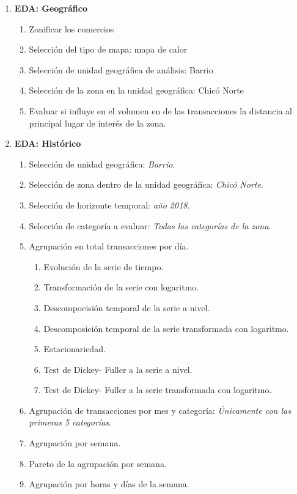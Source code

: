 \documentclass[a4paper]{article}
\begin{document}
\begin{enumerate}
	\item \textbf{EDA: Geográfico}
	\begin{enumerate}
		\item Zonificar los comercios
		\item Selección del tipo de mapa: mapa de calor
		\item Selección de unidad geográfica de análisis: Barrio
		\item Selección de la zona en la unidad geográfica: Chicó Norte
		\item Evaluar si influye en el volumen en de las transacciones la distancia al principal lugar de interés de la zona.
	\end{enumerate}
	\item \textbf{EDA: Histórico}
	\begin{enumerate}
		\item Selección de unidad geográfica: \textit{Barrio}.
		\item Selección de zona dentro de la unidad geográfica: \textit{Chicó Norte}.
		\item Selección de horizonte temporal: \textit{año 2018}.
		\item Selección de categoría a evaluar: \textit{Todas las categorías de la zona}.
		\item Agrupación en total transacciones por día.
		\begin{enumerate}
			\item Evolución de la serie de tiempo.
			\item Transformación de la serie con logaritmo.
			\item Descompocisión temporal de la serie a nivel.
			\item Descomposición temporal de la serie transformada con logaritmo.
			\item Estacionariedad.
			\item Test de Dickey- Fuller a la serie a nivel.
			\item Test de Dickey- Fuller a la serie transformada con logaritmo.
		\end{enumerate}
		\item Agrupación de transacciones por mes y categoría: \textit{Únicamente con las primeras 5 categorías}.
		\item Agrupación por semana.
		\item Pareto de la agrupación por semana.
		\item Agrupación por horas y días de la semana.
	\end{enumerate}
\end{enumerate}
\end{document}
